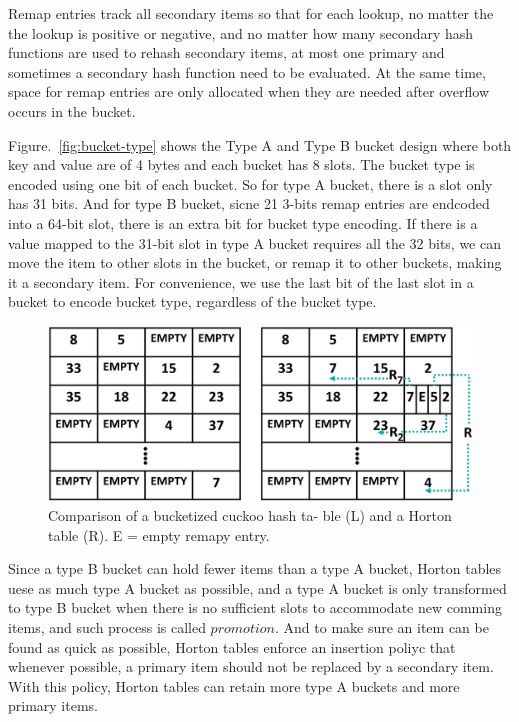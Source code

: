 \documentclass[12pt,conference,compsoc]{IEEEtran}
\begin{document}
Remap entries track all secondary items so that for each lookup, no matter the the lookup is positive or negative, and no matter how many secondary hash functions are used to rehash secondary items, at most one primary and sometimes a secondary hash function need to be evaluated. At the same time, space for remap entries are only allocated when they are needed after overflow occurs in the bucket.

Figure.~\ref{fig:bucket-type} shows the Type A and Type B bucket design where both key and value are of 4 bytes and each bucket has 8 slots. The bucket type is encoded using one bit of each bucket. So for type A bucket, there is a slot only has 31 bits. And for type B bucket, sicne 21 3-bits remap entries are endcoded into a 64-bit slot, there is an extra bit for bucket type encoding. If there is a value mapped to the 31-bit slot in type A bucket requires all the 32 bits, we can move the item to other slots in the bucket, or remap it to other buckets, making it a secondary item. For convenience, we use the last bit of the last slot in a bucket to encode bucket type, regardless of the bucket type.

\begin{figure}
    \centering
    \includegraphics[width=\linewidth]{BCHT-Horton.png}
    \caption{Comparison of a bucketized cuckoo hash ta- ble (L) and a Horton table (R). E = empty remapy entry.} \label{fig:BCHT-Horton}
\end{figure}

Since a type B bucket can hold fewer items than a type A bucket, Horton tables uese as much type A bucket as possible, and a type A bucket is only transformed to type B bucket when there is no sufficient slots to accommodate new comming items, and such process is called $promotion$. And to make sure an item can be found as quick as possible, Horton tables enforce an insertion poliyc that whenever possible, a primary item should not be replaced by a secondary item. With this policy, Horton tables can retain more type A buckets and more primary items. 
\end{document}
